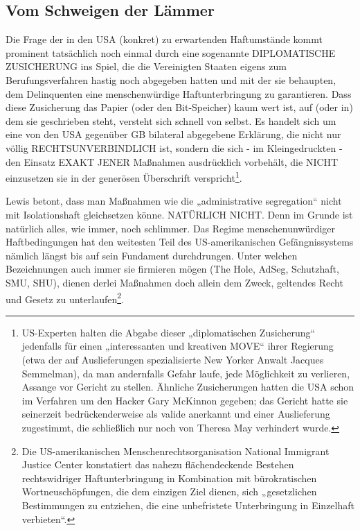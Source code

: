 \begin{multicols}{2}

\chapter{Vom Schweigen der Lämmer}
Die Frage der in den USA (konkret) zu erwartenden Haftumstände kommt prominent tatsächlich noch einmal
durch eine sogenannte DIPLOMATISCHE ZUSICHERUNG ins Spiel, die die Vereinigten Staaten eigens zum
Berufungsverfahren hastig noch abgegeben hatten und
mit der sie behaupten, dem Delinquenten eine menschenwürdige Haftunterbringung zu garantieren. Dass
diese Zusicherung das Papier (oder den Bit-Speicher)
kaum wert ist, auf (oder in) dem sie geschrieben steht,
versteht sich schnell von selbst. Es handelt sich um eine
von den USA gegenüber GB bilateral abgegebene Erklärung, die nicht nur völlig RECHTSUNVERBINDLICH
ist, sondern die sich - im Kleingedruckten - den Einsatz
EXAKT JENER Maßnahmen ausdrücklich vorbehält, die
NICHT einzusetzen sie in der generösen Überschrift verspricht\footnote[14]{US-Experten halten die Abgabe dieser „diplomatischen Zusicherung“ jedenfalls für einen „interessanten und
kreativen MOVE“ ihrer Regierung (etwa der auf Auslieferungen spezialisierte New Yorker Anwalt Jacques Semmelman), da man andernfalls Gefahr laufe, jede Möglichkeit zu verlieren, Assange vor Gericht zu stellen. Ähnliche Zusicherungen hatten die USA schon im Verfahren um den Hacker Gary McKinnon gegeben; das Gericht
hatte sie seinerzeit bedrückenderweise als valide anerkannt und einer Auslieferung zugestimmt, die schließlich
nur noch von Theresa May verhindert wurde.}.

Lewis betont, dass man Maßnahmen wie die „administrative segregation“ nicht mit Isolationshaft gleichsetzen
könne. NATÜRLICH NICHT. Denn im Grunde ist natürlich alles, wie immer, noch schlimmer. Das Regime menschenunwürdiger Haftbedingungen hat den weitesten
Teil des US-amerikanischen Gefängnissystems nämlich
längst bis auf sein Fundament durchdrungen. Unter
welchen Bezeichnungen auch immer sie firmieren mögen (The Hole, AdSeg, Schutzhaft, SMU, SHU), dienen
derlei Maßnahmen doch allein dem Zweck, geltendes
Recht und Gesetz zu unterlaufen\footnote[15]{Die US-amerikanischen Menschenrechtsorganisation National Immigrant Justice Center konstatiert das nahezu flächendeckende Bestehen rechtswidriger Haftunterbringung in Kombination mit bürokratischen Wortneuschöpfungen, die dem einzigen Ziel dienen, sich „gesetzlichen Bestimmungen zu entziehen, die eine unbefristete Unterbringung in Einzelhaft verbieten“.}.


\end{multicols}
